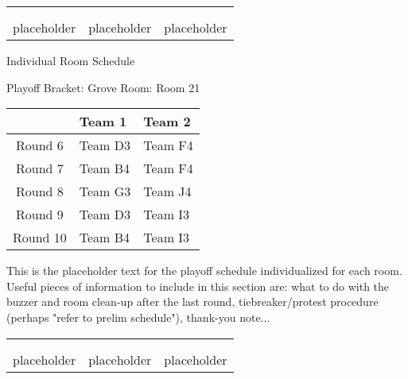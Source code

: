 \documentclass{article}%
\begin{document}
%
\begin{tabularx}{\textwidth}{YYY}%
  &  &  \\%
\\%
placeholder&placeholder&placeholder\\%
\end{tabularx}%
\newpage%
\begin{center}%
\begin{Huge}%
Individual Room Schedule%
\end{Huge}%
\vspace*{16pt}%
\linebreak%
\begin{Large}%
Playoff Bracket: Grove \hfill Room: Room 21%
\end{Large}%
\end{center}%
%
\begin{tabularx}{\textwidth}{|c|Y|Y|}%
\hline%
&Team 1&Team 2\\%
\hline%
Round 6&Team D3&Team F4\\%
Round 7&Team B4&Team F4\\%
Round 8&Team G3&Team J4\\%
Round 9&Team D3&Team I3\\%
Round 10&Team B4&Team I3\\%
\hline%
\end{tabularx}%
\vspace*{16pt}%
\linebreak%
This is the placeholder text for the playoff schedule individualized for each room. Useful pieces of information to include in this section are: what to do with the buzzer and room clean{-}up after the last round, tiebreaker/protest procedure (perhaps "refer to prelim schedule"), thank{-}you note...%
\vspace*{30pt}%
\newline%
%
\begin{tabularx}{\textwidth}{YYY}%
  &  &  \\%
\\%
placeholder&placeholder&placeholder\\%
\end{tabularx}%
\end{document}
